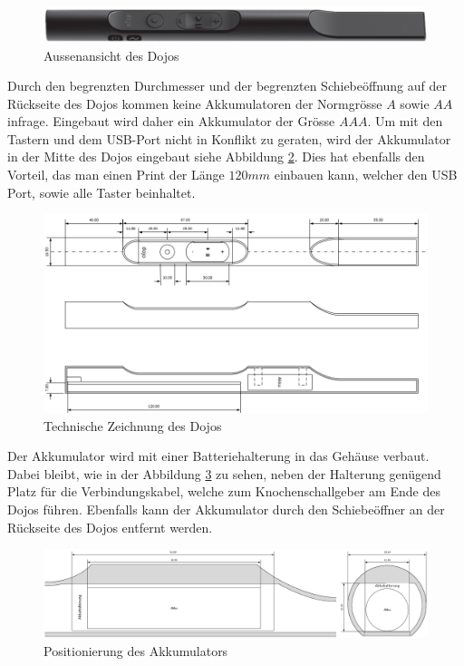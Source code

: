 \begin{figure}[h]
	\centering
	\includegraphics[width=\textwidth]{graphics/DojoBild.png}
	\caption{Aussenansicht des Dojos}
	\label{fig:DojoBild}
\end{figure}

Durch den begrenzten Durchmesser und der begrenzten Schiebeöffnung auf der Rückseite des Dojos kommen keine Akkumulatoren der Normgrösse $A$ sowie $AA$ infrage. Eingebaut wird daher ein Akkumulator der Grösse $AAA$. Um mit den Tastern und dem USB-Port nicht in Konflikt zu geraten, wird der Akkumulator in der Mitte des Dojos eingebaut siehe Abbildung \ref{fig:DojoQuerschnitt}. Dies hat ebenfalls den Vorteil, das man einen Print der Länge $120mm$ einbauen kann, welcher den USB Port, sowie alle Taster beinhaltet.


\begin{figure}[h]
	\centering
	\includegraphics[width=\textwidth]{graphics/DojoQuerschnitt.png}
	\caption{Technische Zeichnung des Dojos}
	\label{fig:DojoQuerschnitt}
\end{figure}

\newpage

Der Akkumulator wird mit einer Batteriehalterung in das Gehäuse verbaut. Dabei bleibt, wie in der Abbildung \ref{fig:DojoAkkumulatorQuerschnitt} zu sehen, neben der Halterung genügend Platz für die Verbindungskabel, welche zum Knochenschallgeber am Ende des Dojos führen. Ebenfalls kann der Akkumulator durch den Schiebeöffner an der Rückseite des Dojos entfernt werden.


\begin{figure}[h]
	\centering
	\includegraphics[width=\textwidth]{graphics/DojoAkkumulatorQuerschnitt.png}
	\caption{Positionierung des Akkumulators}
	\label{fig:DojoAkkumulatorQuerschnitt}
\end{figure}

